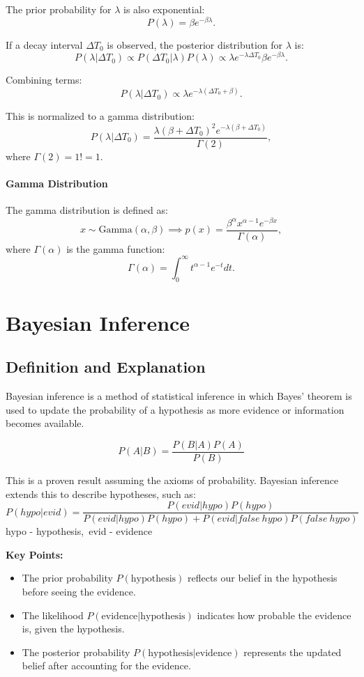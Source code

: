 \documentclass[12pt,a4paper]{article}
\begin{document}
The prior probability for \( \lambda \) is also exponential:
\[
P(\lambda) = \beta e^{-\beta \lambda}.
\]

If a decay interval \( \Delta T_0 \) is observed, the posterior distribution for \( \lambda \) is:
\[
P(\lambda|\Delta T_0) \propto P(\Delta T_0|\lambda)P(\lambda) \propto \lambda e^{-\lambda \Delta T_0} \beta e^{-\beta \lambda}.
\]

Combining terms:
\[
P(\lambda|\Delta T_0) \propto \lambda e^{-\lambda (\Delta T_0 + \beta)}.
\]

This is normalized to a gamma distribution:
\[
P(\lambda|\Delta T_0) = \frac{\lambda (\beta + \Delta T_0)^2 e^{-\lambda (\beta + \Delta T_0)}}{\Gamma(2)},
\]
where \( \Gamma(2) = 1! = 1 \).

\paragraph{Gamma Distribution}
The gamma distribution is defined as:
\[
x \sim \text{Gamma}(\alpha, \beta) \implies p(x) = \frac{\beta^\alpha x^{\alpha-1}e^{-\beta x}}{\Gamma(\alpha)},
\]
where \( \Gamma(\alpha) \) is the gamma function:
\[
\Gamma(\alpha) = \int_0^\infty t^{\alpha-1}e^{-t}dt.
\]



\section{Bayesian Inference}

\subsection{Definition and Explanation}
Bayesian inference is a method of statistical inference in which Bayes' theorem is used to update the probability of a hypothesis as more evidence or information becomes available.

\[
P(A|B) = \frac{P(B|A)P(A)}{P(B)}
\]

This is a proven result assuming the axioms of probability. Bayesian inference extends this to describe hypotheses, such as:
\[
P(hypo|evid) = \frac{P(evid|hypo)P(hypo)}{P(evid|hypo)P(hypo) + P(evid|false\ hypo)P(false\ hypo)} 
\]
hypo - hypothesis,\ evid - evidence

\textbf{Key Points:}
\begin{itemize}
    \item The prior probability $P(\text{hypothesis})$ reflects our belief in the hypothesis before seeing the evidence.
    \item The likelihood $P(\text{evidence|hypothesis})$ indicates how probable the evidence is, given the hypothesis.
    \item The posterior probability $P(\text{hypothesis|evidence})$ represents the updated belief after accounting for the evidence.
\end{itemize}
\end{document}

